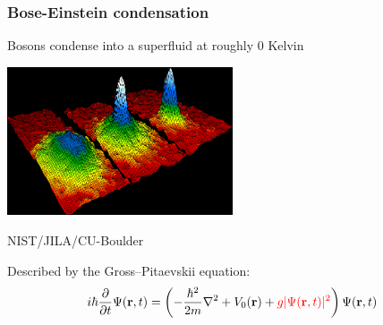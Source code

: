 \documentclass{beamer}
\begin{document}
\begin{frame}
\frametitle{Bose-Einstein condensation}
Bosons condense into a superfluid at roughly 0 Kelvin

\begin{center}
\includegraphics[width=0.5\textwidth]{Bose_Einstein_condensate.png}

\tiny{NIST/JILA/CU-Boulder}
\end{center}

\pause

Described by the Gross--Pitaevskii equation:
\begin{equation*}
    i\hbar \frac{\partial}{\partial t}\Psi(\mathbf{r},t) = \left( - \frac{\hbar^2}{2m} \nabla^2 + V_0(\mathbf{r}) + {\color{red}{g |\Psi(\mathbf{r},t)|^2}}\right)\Psi(\mathbf{r},t)
\end{equation*}


\end{frame}
\end{document}
